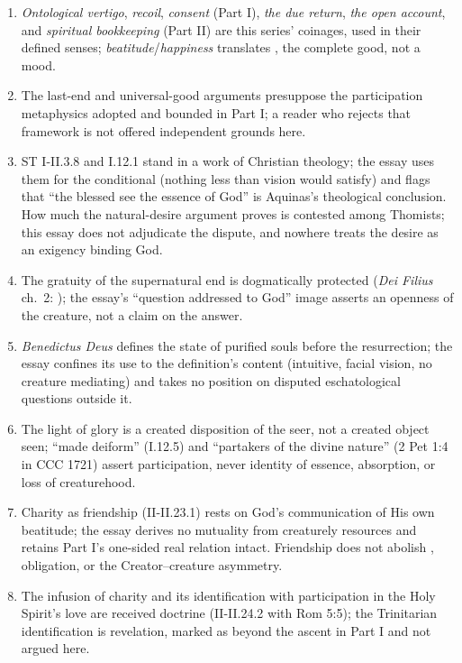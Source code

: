 \begin{enumerate}[leftmargin=1.45em,itemsep=0.25em]
\item \emph{Ontological vertigo}, \emph{recoil}, \emph{consent} (Part I), \emph{the due return}, \emph{the open account}, and \emph{spiritual bookkeeping} (Part II) are this series' coinages, used in their defined senses; \emph{beatitude}/\emph{happiness} translates , the complete good, not a mood.
\item The last-end and universal-good arguments presuppose the participation metaphysics adopted and bounded in Part I; a reader who rejects that framework is not offered independent grounds here.
\item ST I-II.3.8 and I.12.1 stand in a work of Christian theology; the essay uses them for the conditional (nothing less than vision would satisfy) and flags that ``the blessed see the essence of God'' is Aquinas's theological conclusion. How much the natural-desire argument proves is contested among Thomists; this essay does not adjudicate the dispute, and nowhere treats the desire as an exigency binding God.
\item The gratuity of the supernatural end is dogmatically protected (\emph{Dei Filius} ch.~2: ); the essay's ``question addressed to God'' image asserts an openness of the creature, not a claim on the answer.
\item \emph{Benedictus Deus} defines the state of purified souls before the resurrection; the essay confines its use to the definition's content (intuitive, facial vision, no creature mediating) and takes no position on disputed eschatological questions outside it.
\item The light of glory is a created disposition of the seer, not a created object seen; ``made deiform'' (I.12.5) and ``partakers of the divine nature'' (2 Pet 1:4 in CCC 1721) assert participation, never identity of essence, absorption, or loss of creaturehood.
\item Charity as friendship (II-II.23.1) rests on God's communication of His own beatitude; the essay derives no mutuality from creaturely resources and retains Part I's one-sided real relation intact. Friendship does not abolish , obligation, or the Creator--creature asymmetry.
\item The infusion of charity and its identification with participation in the Holy Spirit's love are received doctrine (II-II.24.2 with Rom 5:5); the Trinitarian identification is revelation, marked as beyond the ascent in Part I and not argued here.

\end{enumerate}
